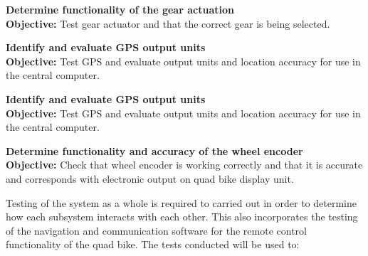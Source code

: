 \documentclass[main.tex]{subfiles}
\begin{document}
\begin{appendices}
\begin{qb}
\textbf{Determine functionality of the gear actuation}\\
\textbf{Objective:} Test gear actuator and that the  correct gear is being selected.

\end{qb}

\begin{qb}
\textbf{Identify and evaluate GPS output units}\\
\textbf{Objective:} Test GPS and evaluate output units and location accuracy for use in the central computer. 

\end{qb}

\begin{qb}
\textbf{Identify and evaluate GPS output units}\\
\textbf{Objective:} Test GPS and evaluate output units and location accuracy for use in the central computer. 

\end{qb}

\begin{qb}
\textbf{Determine functionality and accuracy of the wheel encoder}\\
\textbf{Objective:} Check that wheel encoder is working correctly and that it is accurate and corresponds with electronic output on quad bike display unit.

\end{qb}


\medskip\noindent 
Testing of the system as a whole is required to carried out in order to determine how each subsystem interacts with each other. This also incorporates the testing of the navigation and communication software for the remote control functionality of the quad bike. The tests conducted will be used to:



\end{appendices}
\end{document}
